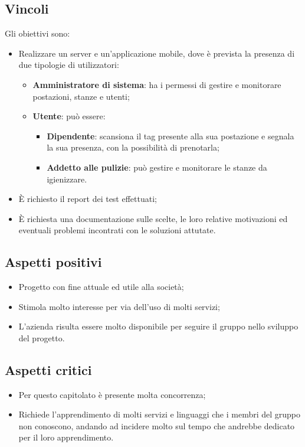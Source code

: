 \subsection{Vincoli}
Gli obiettivi sono:
\begin{itemize}
\item	Realizzare un server e un'applicazione mobile, dove è prevista la presenza di due tipologie di utilizzatori:
\begin{itemize}
\item	\textbf{Amministratore di sistema}: ha i permessi di gestire e monitorare postazioni, stanze e utenti;
\item	\textbf{Utente}: può essere:

\begin{itemize}
\item \textbf{Dipendente}: scansiona il tag presente alla sua postazione e segnala la sua presenza, con la possibilità di prenotarla;

\item \textbf{Addetto alle pulizie}: può gestire e monitorare le stanze da igienizzare.
\end{itemize}

\end{itemize}
\item	È richiesto il report dei test effettuati;
\item	È richiesta una documentazione sulle scelte, le loro relative motivazioni ed eventuali problemi incontrati con le soluzioni attutate.
\end{itemize}

\subsection{Aspetti positivi}
\begin{itemize}
\item	Progetto con fine attuale ed utile alla società;
\item	Stimola molto interesse per via dell'uso di molti servizi;
\item	L'azienda risulta essere molto disponibile per seguire il gruppo nello sviluppo del progetto.
\end{itemize}
\subsection{Aspetti critici}
\begin{itemize}
\item	Per questo capitolato è presente molta concorrenza;
\item	Richiede l'apprendimento di molti servizi e linguaggi che i membri del gruppo non conoscono, andando ad incidere molto sul tempo che andrebbe dedicato per il loro apprendimento.
\end{itemize}


